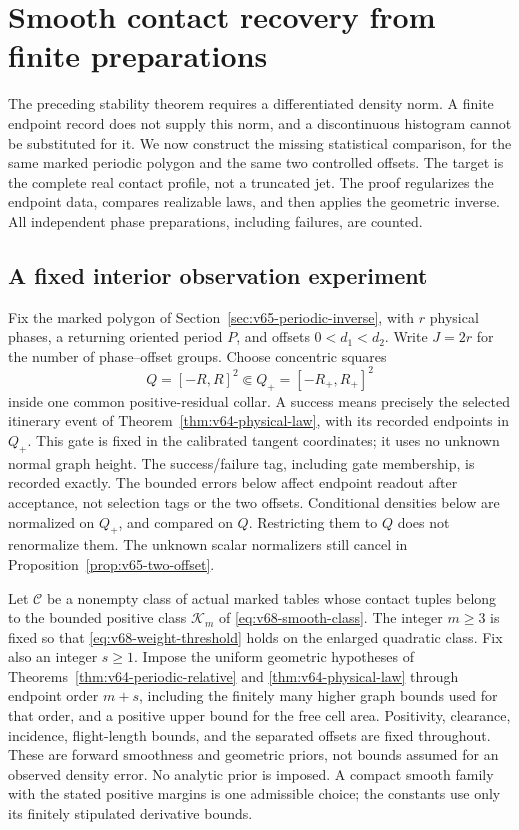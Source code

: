 \section{Smooth contact recovery from finite preparations}
\label{sec:v69-sampled-contact}

The preceding stability theorem requires a differentiated density norm.
A finite endpoint record does not supply this norm, and a discontinuous
histogram cannot be substituted for it.  We now construct the missing
statistical comparison, for the same marked periodic polygon and the
same two controlled offsets.  The target is the complete real contact
profile, not a truncated jet.  The proof regularizes the endpoint data,
compares realizable laws, and then applies the geometric inverse.  All
independent phase preparations, including failures, are counted.

\subsection{A fixed interior observation experiment}

Fix the marked polygon of Section~\ref{sec:v65-periodic-inverse}, with
$r$ physical phases, a returning oriented period $P$, and offsets
$0<d_1<d_2$.  Write $J=2r$ for the number of phase--offset groups.
Choose concentric squares
\[
 Q=[-R,R]^2\Subset Q_+=[-R_+,R_+]^2
\]
inside one common positive-residual collar.  A success means precisely
the selected itinerary event of Theorem~\ref{thm:v64-physical-law},
with its recorded endpoints in $Q_+$.  This gate is fixed in the calibrated
tangent coordinates; it uses no unknown normal graph height.  The
success/failure tag, including gate membership, is recorded exactly.
The bounded errors below affect endpoint readout after acceptance, not
selection tags or the two offsets.  Conditional
densities below are normalized on $Q_+$, and compared on $Q$.  Restricting
them to $Q$ does not renormalize them.  The unknown scalar normalizers
still cancel in Proposition~\ref{prop:v65-two-offset}.

Let $\mathscr C$ be a nonempty class of actual marked tables whose contact
tuples belong to the bounded positive class $\mathcal K_m$ of
\eqref{eq:v68-smooth-class}.  The integer $m\ge3$ is fixed so that
\eqref{eq:v68-weight-threshold} holds on the enlarged quadratic class.
Fix also an integer $s\ge1$.  Impose the uniform geometric hypotheses
of Theorems~\ref{thm:v64-periodic-relative} and
\ref{thm:v64-physical-law} through endpoint order $m+s$, including
the finitely many higher graph bounds used for that order, and a positive
upper bound for the free cell area.  Positivity, clearance, incidence,
flight-length bounds, and the separated offsets are fixed throughout.
These are forward smoothness and geometric priors, not bounds assumed
for an observed density error.  No analytic prior is imposed.  A compact
smooth family with the stated positive margins is one admissible choice;
the constants use only its finitely stipulated derivative bounds.

